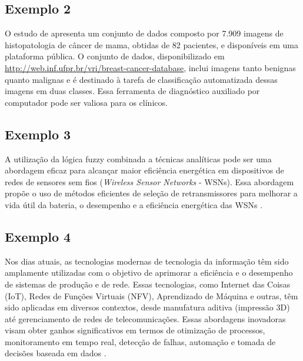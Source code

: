 \subsection{Exemplo 2}
O estudo de \citet{spanhol2015dataset} apresenta um conjunto de dados composto por 7.909 imagens de histopatologia de câncer de mama, obtidas de 82 pacientes, e disponíveis em uma plataforma pública. O conjunto de dados, disponibilizado em \url{http://web.inf.ufpr.br/vri/breast-cancer-database}, inclui imagens tanto benignas quanto malignas e é destinado à tarefa de classificação automatizada dessas imagens em duas classes. Essa ferramenta de diagnóstico auxiliado por computador pode ser valiosa para os clínicos. 

\subsection{Exemplo 3}

A utilização da lógica fuzzy combinada a técnicas analíticas pode ser uma abordagem eficaz para alcançar maior eficiência energética em dispositivos de redes de sensores sem fios (\textit{Wireless Sensor Networks} - WSNs). Essa abordagem propõe o uso de métodos eficientes de seleção de retransmissores para melhorar a vida útil da bateria, o desempenho e a eficiência energética das WSNs \cite{engel2013relay}.

\subsection{Exemplo 4}

Nos dias atuais, as tecnologias modernas de tecnologia da informação têm sido amplamente utilizadas com o objetivo de aprimorar a eficiência e o desempenho de sistemas de produção e de rede. Essas tecnologias, como Internet das Coisas (IoT), Redes de Funções Virtuais (NFV), Aprendizado de Máquina e outras, têm sido aplicadas em diversos contextos, desde manufatura aditiva (impressão 3D) até gerenciamento de redes de telecomunicações. Essas abordagens inovadoras visam obter ganhos significativos em termos de otimização de processos, monitoramento em tempo real, detecção de falhas, automação e tomada de decisões baseada em dados \cite{huff2020building,scheffel2021automated}. 

